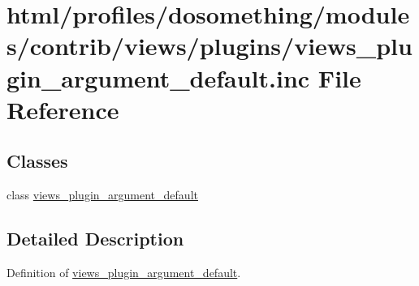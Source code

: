 \hypertarget{views__plugin__argument__default_8inc}{
\section{html/profiles/dosomething/modules/contrib/views/plugins/views\_\-plugin\_\-argument\_\-default.inc File Reference}
\label{views__plugin__argument__default_8inc}
}
\subsection*{Classes}
\begin{DoxyCompactItemize}
\item 
class \hyperlink{classviews__plugin__argument__default}{views\_\-plugin\_\-argument\_\-default}
\end{DoxyCompactItemize}


\subsection{Detailed Description}
Definition of \hyperlink{classviews__plugin__argument__default}{views\_\-plugin\_\-argument\_\-default}. 